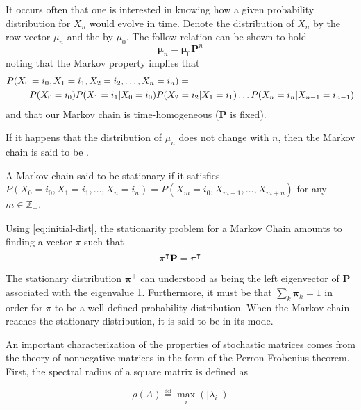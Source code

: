 It occurs often that one is interested in knowing how a given probability distribution
for $X_n$ would evolve in time.  Denote the
distribution of $X_n$ by the row vector $\mu_n$ and the 
by $\mu_0$. The follow relation can be shown to hold
\begin{equation}
 \mathbf{\mu}_n= \mathbf{\mu}_0 \mathbf{P}^n \label{eq:initial-dist}
\end{equation}
noting that the Markov property implies that
\begin{align}
P(X_0 &= i_0, X_1 = i_1, X_2 = i_2, \dots, X_n = i_n) = \notag \\
&P(X_0 = i_0) P(X_1 = i_1 | X_0 = i_0) P(X_2 = i_2 | X_1 = i_1) \dots P(X_n = i_n |
X_{n-1} = i_{n-1})
\end{align}
and that our Markov chain is time-homogeneous ($\mathbf{P}$ is fixed).

If it happens that the distribution of $\mu_n$ does not change with $n$, then 
 the Markov chain is said to be . 

\begin{defn}
A Markov chain said to be stationary if it satisfies $P(X_0 = i_0, X_1 = i_1, \dots, X_n
= i_n) = P(X_m = i_0, X_{m+1}, \dots, X_{m+n})$ for any $m \in \mathbb{Z_+}$.
\end{defn}

Using \ref{eq:initial-dist}, the stationarity problem for a Markov Chain amounts to
finding a vector $\pi$ such that
\begin{equation}
\mathbf{\pi}^\intercal \mathbf{P} = \mathbf{\pi}^\intercal
\end{equation}

The stationary distribution $\mathbf{\pi}^\intercal$ can understood as being the left
eigenvector of $\mathbf{P}$ associated with the eigenvalue 1. Furthermore, it must be
that $\sum_k \mathbf{\pi}_k = 1$ in order for $\pi$ to be a well-defined probability
distribution. When the Markov chain reaches the stationary distribution, it is said to be
in its  mode.

An important characterization of the properties of stochastic matrices comes from the
theory of nonnegative matrices in the form of the Perron-Frobenius theorem. First, the spectral radius of a square matrix is defined as 

\begin{equation}
\rho(A) \overset{\underset{\mathrm{def}}{}}{=} \max_i(|\lambda_i|)
\end{equation}

